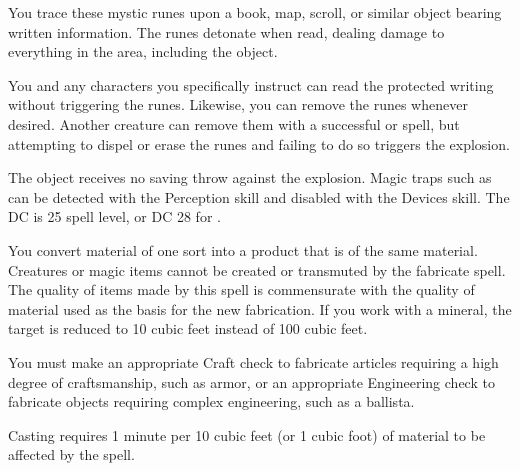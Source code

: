 \begin{spelleffect}
You trace these mystic runes upon a book, map, scroll, or similar object bearing written information. The runes detonate when read, dealing damage to everything in the area, including the object.
\par You and any characters you specifically instruct can read the protected writing without triggering the runes. Likewise, you can remove the runes whenever desired. Another creature can remove them with a successful  or  spell, but attempting to dispel or erase the runes and failing to do so triggers the explosion.
\end{spelleffect}
\begin{spellnotes}
The object receives no saving throw against the explosion. Magic traps such as  can be detected with the Perception skill and disabled with the Devices skill. The DC is 25 \add spell level, or DC 28 for .
\end{spellnotes}

\spellrng{\rngclose}
\begin{spelleffect}
You convert material of one sort into a product that is of the same material. Creatures or magic items cannot be created or transmuted by the fabricate spell. The quality of items made by this spell is commensurate with the quality of material used as the basis for the new fabrication. If you work with a mineral, the target is reduced to 10 cubic feet instead of 100 cubic feet.
\par You must make an appropriate Craft check to fabricate articles requiring a high degree of craftsmanship, such as armor, or an appropriate Engineering check to fabricate objects requiring complex engineering, such as a ballista.
\par Casting requires 1 minute per 10 cubic feet (or 1 cubic foot) of material to be affected by the spell.
\end{spelleffect}

